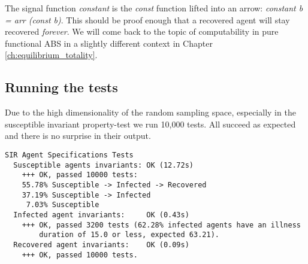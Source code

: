 The signal function \textit{constant} is the \textit{const} function lifted into an arrow: \textit{constant b = arr (const b)}. This should be proof enough that a recovered agent will stay recovered \textit{forever}. We will come back to the topic of computability in pure functional ABS in a slightly different context in Chapter \ref{ch:equilibrium_totality}.

\subsection{Running the tests}
Due to the high dimensionality of the random sampling space, especially in the susceptible invariant property-test we run 10,000 tests. All succeed as expected and there is no surprise in their output.

\begin{verbatim}
SIR Agent Specifications Tests
  Susceptible agents invariants: OK (12.72s)
    +++ OK, passed 10000 tests:
    55.78% Susceptible -> Infected -> Recovered
    37.19% Susceptible -> Infected
     7.03% Susceptible
  Infected agent invariants:     OK (0.43s)
    +++ OK, passed 3200 tests (62.28% infected agents have an illness 
        duration of 15.0 or less, expected 63.21).
  Recovered agent invariants:    OK (0.09s)
    +++ OK, passed 10000 tests.
\end{verbatim}
